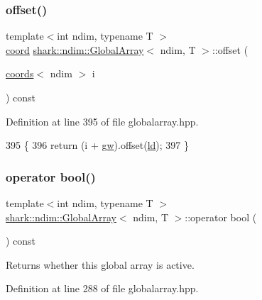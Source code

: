 \subsubsection{\texorpdfstring{offset()}{offset()}}
{\footnotesize\ttfamily template$<$int ndim, typename T $>$ \\
\hyperlink{namespaceshark_a767a92d5dd82cb82266473bff42fa6d9}{coord} \hyperlink{classshark_1_1ndim_1_1_global_array}{shark\+::ndim\+::\+Global\+Array}$<$ ndim, T $>$\+::offset (\begin{DoxyParamCaption}\item[{\hyperlink{structshark_1_1ndim_1_1coords}{coords}$<$ ndim $>$}]{i }\end{DoxyParamCaption}) const\hspace{0.3cm}{\ttfamily [inline]}}



Definition at line 395 of file globalarray.\+hpp.


\begin{DoxyCode}
395                                                                      \{
396             \textcolor{keywordflow}{return} (i + \hyperlink{classshark_1_1ndim_1_1_global_array_a38d93d114d585e5e5491c5ecd35c6bfc}{gw}).offset(\hyperlink{classshark_1_1ndim_1_1_global_array_afdc4665e0fde4a703785436af351df49}{ld});
397         \}
\end{DoxyCode}
\hypertarget{classshark_1_1ndim_1_1_global_array_aca73ba70ecbbc7f3224fd48582a15447}{}\label{classshark_1_1ndim_1_1_global_array_aca73ba70ecbbc7f3224fd48582a15447} 
\subsubsection{\texorpdfstring{operator bool()}{operator bool()}}
{\footnotesize\ttfamily template$<$int ndim, typename T $>$ \\
\hyperlink{classshark_1_1ndim_1_1_global_array}{shark\+::ndim\+::\+Global\+Array}$<$ ndim, T $>$\+::operator bool (\begin{DoxyParamCaption}{ }\end{DoxyParamCaption}) const\hspace{0.3cm}{\ttfamily [inline]}}

Returns whether this global array is active. 

Definition at line 288 of file globalarray.\+hpp.


